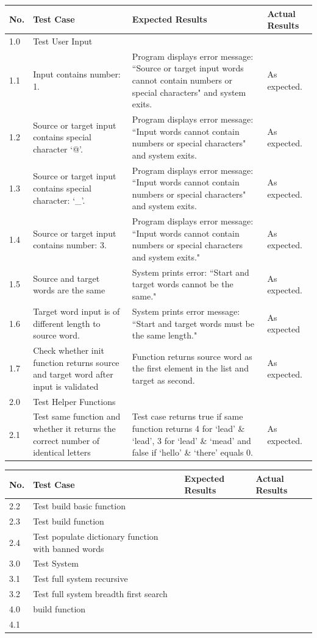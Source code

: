 \documentclass[12pt, a4]{report}
\begin{document}
		\begin{tabular}{ |p{0.5cm}|p{5cm}|p{5cm}|p{5cm}| }
			\hline
			No. & Test Case & Expected Results & Actual Results \\
			\hline
			1.0 & Test User Input &  & \\
			1.1 & Input contains number: 1. & Program displays error message: ``Source or target input words cannot contain numbers or special characters" and system exits. & As expected.\\
			1.2 & Source or target input contains special character `@'. & Program displays error message: ``Input words cannot contain numbers or special characters" and system exits. & As expected. \\
			1.3 & Source or target input contains special character: `\_'. & Program displays error message: ``Input words cannot contain numbers or special characters" and system exits. & As expected. \\
			1.4 & Source or target input contains number: 3. & Program displays error message: ``Input words cannot contain numbers or special characters and system exits." & As expected. \\
			1.5 & Source and target words are the same & System prints error: ``Start and target words cannot be the same." & As expected. \\
			1.6 & Target word input is of different length to source word. & System prints error message: ``Start and target words must be the same length." & As expected \\
			1.7 & Check whether init function returns source and target word after input is validated & Function returns source word as the first element in the list and target as second. & As expected.\\
			2.0 & Test Helper Functions &  &  \\
			2.1 & Test same function and whether it returns the correct number of identical letters & Test case returns true if same function returns 4 for `lead' \& `lead', 3 for `lead' \& `mead' and false if `hello' \& `there' equals 0. & As expected. \\
			\hline
		\end{tabular}

			\pagebreak[4]
			
		\begin{tabular}{ |p{0.5cm}|p{5cm}|p{5cm}|p{5cm}| } 
			\hline
			No. & Test Case & Expected Results & Actual Results \\
			\hline
			2.2 & Test build basic function  & & \\
			2.3 & Test build function &  & \\
			2.4 & Test populate dictionary function with banned words &  & \\ 
			3.0 & Test System &  &  \\
			3.1 & Test full system recursive & & \\
			3.2 & Test full system breadth first search &  & \\
			4.0 & build function &  &  \\
			4.1 &  &  & \\
			\hline
		\end{tabular}
	\newpage
\end{document}

